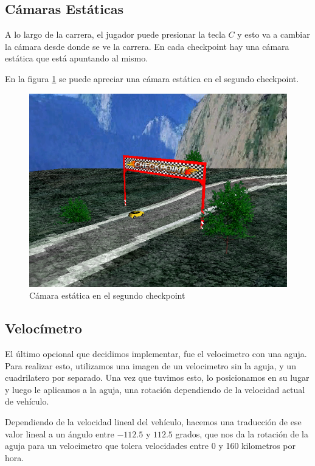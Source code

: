 \documentclass[a4paper,10pt]{article}
\begin{document}
\subsection{C\'amaras Est\'aticas}

A lo largo de la carrera, el jugador puede presionar la tecla $C$ y esto va a
cambiar la c\'amara desde donde se ve la carrera.  En cada checkpoint hay una
c\'amara est\'atica que est\'a apuntando al mismo.

En la figura \ref{fig:static} se puede apreciar una c\'amara est\'atica en el
segundo checkpoint.

\begin{figure}
 \centering
 \includegraphics[bb=0 0 640 480,scale=0.4,keepaspectratio=true]{./static.png}
 \caption{C\'amara est\'atica en el segundo checkpoint}
 \label{fig:static}
\end{figure}

\subsection{Veloc\'imetro}

El \'ultimo opcional que decidimos implementar, fue el velocimetro con una
aguja.  Para realizar esto, utilizamos una imagen de un velocimetro sin la
aguja, y un cuadrilatero por separado.  Una vez que tuvimos esto, lo
posicionamos en su lugar y luego le aplicamos a la aguja, una rotaci\'on
dependiendo de la velocidad actual de veh\'iculo.

Dependiendo de la velocidad lineal del veh\'iculo, hacemos una traducci\'on de
ese valor lineal a un \'angulo entre $-112.5$ y $112.5$ grados, que nos da la
rotaci\'on de la aguja para un velocimetro que tolera velocidades entre 0 y 160
kilometros por hora.
\end{document}
